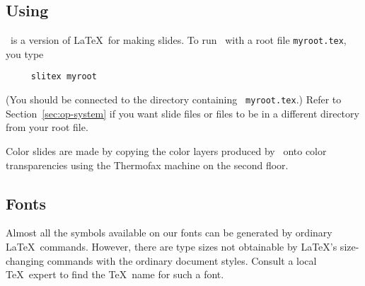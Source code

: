 
\subsection{Using \SLiTeX}

\SLiTeX\ is a version of \LaTeX\ for making slides.
To run \SLiTeX\  with a root file \mbox{\tt myroot.tex}, you type
\begin{verbatim}
     slitex myroot
\end{verbatim}
(You should be connected to the directory containing \mbox{\tt
myroot.tex}.) Refer to Section~\ref{sec:op-system} if you want slide
files or \hbox{\verb||} files to be in a different directory from
your root file.

Color slides are made by copying the color layers produced by \SLiTeX\
onto color transparencies using the Thermofax machine on the second
floor.

\subsection{Fonts}

Almost all the symbols available on our fonts can be generated by
ordinary \LaTeX\ commands.  However, there are type sizes not
obtainable by \LaTeX's size-changing commands with the ordinary
document styles.  Consult a local \TeX\ expert to find the
\TeX\ name for such a font.

